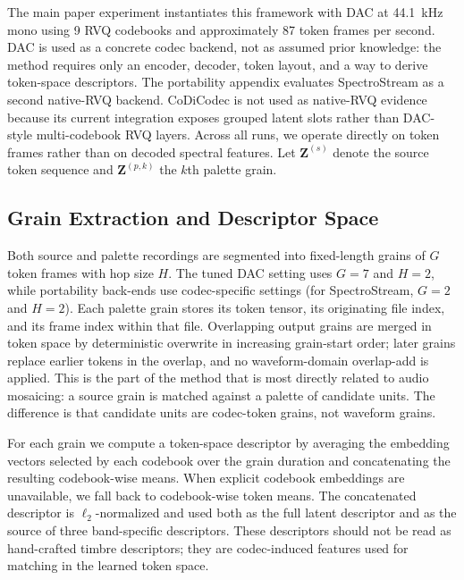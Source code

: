 \documentclass[twoside,a4paper]{article}
\begin{document}
The main paper experiment instantiates this framework with DAC at 44.1~kHz mono using 9 RVQ codebooks and approximately 87 token frames per second. DAC is used as a concrete codec backend, not as assumed prior knowledge: the method requires only an encoder, decoder, token layout, and a way to derive token-space descriptors. The portability appendix evaluates SpectroStream as a second native-RVQ backend. CoDiCodec is not used as native-RVQ evidence because its current integration exposes grouped latent slots rather than DAC-style multi-codebook RVQ layers. Across all runs, we operate directly on token frames rather than on decoded spectral features. Let $\mathbf{Z}^{(s)}$ denote the source token sequence and $\mathbf{Z}^{(p,k)}$ the $k$th palette grain.

\subsection{Grain Extraction and Descriptor Space}

Both source and palette recordings are segmented into fixed-length grains of $G$ token frames with hop size $H$. The tuned DAC setting uses $G=7$ and $H=2$, while portability back-ends use codec-specific settings (for SpectroStream, $G=2$ and $H=2$). Each palette grain stores its token tensor, its originating file index, and its frame index within that file. Overlapping output grains are merged in token space by deterministic overwrite in increasing grain-start order; later grains replace earlier tokens in the overlap, and no waveform-domain overlap-add is applied. This is the part of the method that is most directly related to audio mosaicing: a source grain is matched against a palette of candidate units. The difference is that candidate units are codec-token grains, not waveform grains.

For each grain we compute a token-space descriptor by averaging the embedding vectors selected by each codebook over the grain duration and concatenating the resulting codebook-wise means. When explicit codebook embeddings are unavailable, we fall back to codebook-wise token means. The concatenated descriptor is $\ell_2$-normalized and used both as the full latent descriptor and as the source of three band-specific descriptors. These descriptors should not be read as hand-crafted timbre descriptors; they are codec-induced features used for matching in the learned token space.
\end{document}
